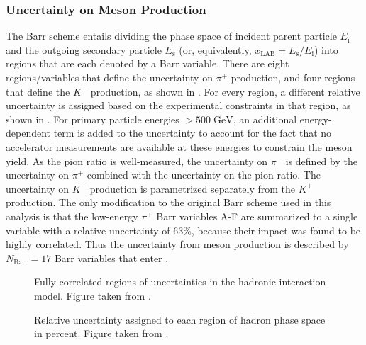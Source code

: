 \subsubsection{Uncertainty on Meson Production}
The Barr scheme entails dividing the phase space of incident parent particle $E_\mathrm{i}$ and the outgoing secondary particle $E_\mathrm{s}$ (or, equivalently, $x_{\mathrm{LAB}}=E_\mathrm{s}/E_\mathrm{i}$) into regions that are each denoted by a Barr variable. There are eight regions/variables that define the uncertainty on $ \pi^+ $ production, and four regions that define the $K^+$ production, as shown in . For every region, a different relative uncertainty is assigned based on the experimental constraints in that region, as shown in . For primary particle energies $>500\;\mathrm{GeV}$, an additional energy-dependent term is added to the uncertainty to account for the fact that no accelerator measurements are available at these energies to constrain the meson yield. As the pion ratio is well-measured, the uncertainty on $ \pi^- $ is defined by the uncertainty on $ \pi^+ $ combined with the uncertainty on the pion ratio. The uncertainty on $ K^- $ production is parametrized separately from the $K^+$ production. The only modification to the original Barr scheme used in this analysis is that the low-energy $ \pi^+ $ Barr variables A-F are summarized to a single variable with a relative uncertainty of 63\%, because their impact was found to be highly correlated. Thus the uncertainty from meson production is described by $N_\mathrm{Barr}=17$ Barr variables that enter .

\begin{figure}
    \centering
    
    \caption{Fully correlated regions of uncertainties in the hadronic interaction model. Figure taken from \cite{Barr2006}.}
\end{figure}
\begin{figure}
    \centering
    
    \caption{Relative uncertainty assigned to each region of hadron phase space in percent. Figure taken from \cite{Barr2006}.}
\end{figure}

